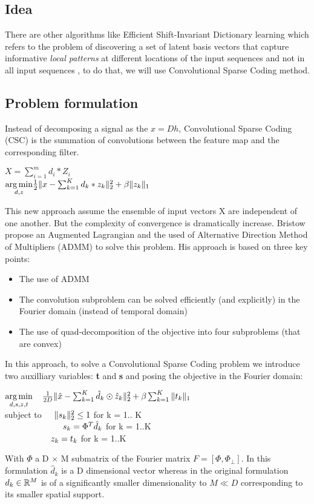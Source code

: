 \subsection{Idea}
There are other algorithms like Efficient Shift-Invariant Dictionary learning which refers to the problem of discovering a set of latent basis vectors that capture informative \textit{local patterns} at different locations of the input sequences and not in all input sequences \cite{Zheng:2016:ESD:2939672.2939824}, to do that, we will use Convolutional Sparse Coding method.  
\subsection{Problem formulation}
Instead  of decomposing a signal as the $x = Dh$, Convolutional Sparse Coding (CSC) is the summation of convolutions between the feature map and the corresponding filter.
\begin{center}
 $X = \sum_{i=1}^{m} d_i * Z_i$\\  \vspace{0.4cm}
  $\underset{d, z}{\operatorname*{arg\,min}}  \frac{1}{2} \| x - \sum_{k=1}^{K} d_k * z_k \|_2^2 + \beta \|z_k \|_1$\\

\end{center}
This new approach assume the ensemble of input vectors X are independent of one another. But the complexity of convergence is dramatically increase.
Bristow propose an Augmented Lagrangian and the used of  Alternative Direction Method of Multipliers (ADMM) \cite{6618901} to solve this problem. His approach is based on three key points:
\begin{itemize}
 \item The use of ADMM
 \item The convolution subproblem can be solved efficiently (and explicitly) in the Fourier domain (instead of temporal domain)
\item The use of quad-decomposition of the objective into four subproblems (that are convex)
\end{itemize}
In this approach, to solve a Convolutional Sparse Coding problem we introduce two auxilliary variables: \textbf{t} and \textbf{s} and posing the objective in the Fourier domain:
\begin{center}
$\underset{d, s, z, t}{\operatorname*{arg\,min}} \hspace{0.4cm} \frac{1}{2D} \| \hat{x} - \sum_{k=1}^{K} \hat{d}_{k} \odot \hat{z}_k \|^2_2 + \beta \sum_{k=1}^{K} \|t_k\|_1$\\
subject to $\hspace{0.4cm} \|s_k\|^2_2 \leq 1 $ for k = 1.. K\\
                $ \hspace{2.4cm}s_k = \Phi^T \hat{d}_k$ for k = 1..K\\
                $\hspace{1.9cm}z_k = t_k$ for k = 1..K
\end{center}
With $\Phi$ a D $\times$ M submatrix of the Fourier matrix $F = [\Phi,\Phi_\bot]$. In this formulation $\hat{d}_k$ is a D dimensional vector whereas in the original formulation $d_k \in \mathbb{R}^M$  is of a significantly smaller dimensionality to $M \ll D$  corresponding to its smaller spatial support. 
